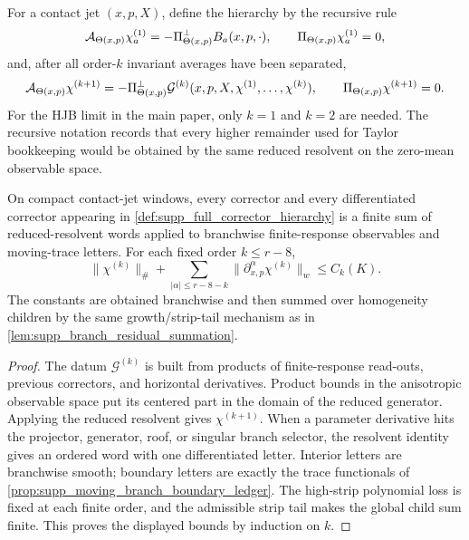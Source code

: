 \begin{definition}
\label{def:supp_full_corrector_hierarchy}
For a contact jet \((x,p,X)\), define the hierarchy by the recursive rule
\[
  \mathcal A_{\Theta(x,p)}\chi^{(1)}_{a}
  =
  -\Pi^\perp_{\Theta(x,p)}B_a(x,p,\cdot),
  \qquad
  \Pi_{\Theta(x,p)}\chi^{(1)}_a=0,
\]
and, after all order-\(k\) invariant averages have been separated,
\[
  \mathcal A_{\Theta(x,p)}\chi^{(k+1)}
  =
  -\Pi^\perp_{\Theta(x,p)}
  \mathcal G^{(k)}(x,p,X,\chi^{(1)},\ldots,\chi^{(k)}),
  \qquad
  \Pi_{\Theta(x,p)}\chi^{(k+1)}=0 .
\]
For the HJB limit in the main paper, only \(k=1\) and \(k=2\) are needed.  The
recursive notation records that every higher remainder used for Taylor
bookkeeping would be obtained by the same reduced resolvent on the zero-mean
observable space.
\end{definition}

\begin{proposition}
\label{prop:supp_corrector_hierarchy_closure}
On compact contact-jet windows, every corrector and every differentiated
corrector appearing in \cref{def:supp_full_corrector_hierarchy} is a finite
sum of reduced-resolvent words applied to branchwise finite-response
observables and moving-trace letters.  For each fixed order \(k\le r-8\),
\[
  \|\chi^{(k)}\|_{\#}
  +\sum_{|\alpha|\le r-8-k}
  \|\partial_{x,p}^{\alpha}\chi^{(k)}\|_{w}
  \le C_k(K).
\]
The constants are obtained branchwise and then summed over homogeneity
children by the same growth/strip-tail mechanism as in
\cref{lem:supp_branch_residual_summation}.
\end{proposition}

\begin{proof}
The datum \(\mathcal G^{(k)}\) is built from products of finite-response
read-outs, previous correctors, and horizontal derivatives.  Product bounds in
the anisotropic observable space put its centered part in the domain of the
reduced generator.  Applying the reduced resolvent gives \(\chi^{(k+1)}\).
When a parameter derivative hits the projector, generator, roof, or singular
branch selector, the resolvent identity gives an ordered word with one
differentiated letter.  Interior letters are branchwise smooth; boundary
letters are exactly the trace functionals of
\cref{prop:supp_moving_branch_boundary_ledger}.  The high-strip polynomial
loss is fixed at each finite order, and the admissible strip tail makes the
global child sum finite.  This proves the displayed bounds by induction on
\(k\).
\end{proof}

